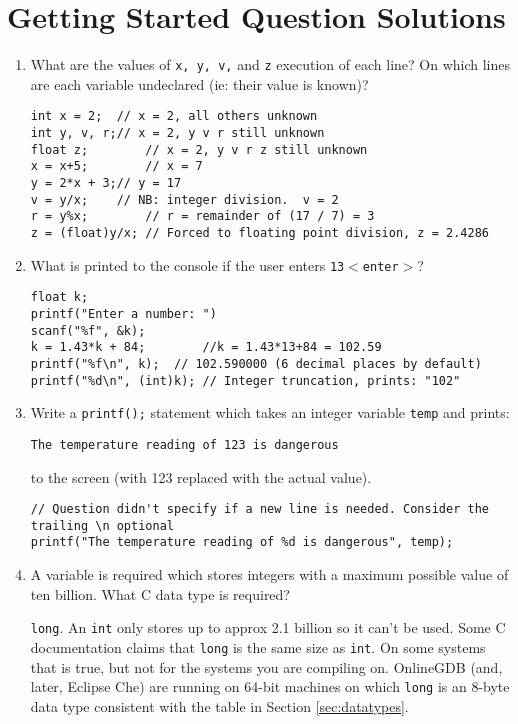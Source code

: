 \documentclass{lab}
\begin{document}
\section{Getting Started Question Solutions}
\begin{enumerate}
\item What are the values of \texttt{x, y, v,} and \texttt{z} execution of each line? On which lines are each variable undeclared (ie: their value is known)?
\begin{lstlisting}[style=CStyle]
int x = 2;	// x = 2, all others unknown
int y, v, r;// x = 2, y v r still unknown
float z;		// x = 2, y v r z still unknown
x = x+5;		// x = 7
y = 2*x + 3;// y = 17
v = y/x; 	// NB: integer division.  v = 2
r = y%x;		// r = remainder of (17 / 7) = 3
z = (float)y/x; // Forced to floating point division, z = 2.4286
\end{lstlisting}
\item What is printed to the console if the user enters \texttt{13$<$enter$>$}?
\begin{lstlisting}[style=CStyle]
float k;
printf("Enter a number: ")
scanf("%f", &k);
k = 1.43*k + 84;		//k = 1.43*13+84 = 102.59
printf("%f\n", k);	// 102.590000 (6 decimal places by default)
printf("%d\n", (int)k); // Integer truncation, prints: "102"
\end{lstlisting}
\item Write a \texttt{printf();} statement which takes an integer variable \texttt{temp} and prints:

\texttt{The temperature reading of 123 is dangerous}

to the screen (with 123 replaced with the actual value).

\begin{lstlisting}[style=CStyle]
// Question didn't specify if a new line is needed. Consider the trailing \n optional
printf("The temperature reading of %d is dangerous", temp);
\end{lstlisting}

\item A variable is required which stores integers with a maximum possible value of ten billion. What C data type is required?

\texttt{long}. An \texttt{int} only stores up to approx 2.1 billion so it can't be used. Some C documentation claims that \texttt{long} is the same size as \texttt{int}. On some systems that is true, but not for the systems you are compiling on. OnlineGDB (and, later, Eclipse Che) are running on 64-bit machines on which \texttt{long} is an 8-byte data type consistent with the table in Section \ref{sec:datatypes}.


\end{enumerate}
\end{document}
